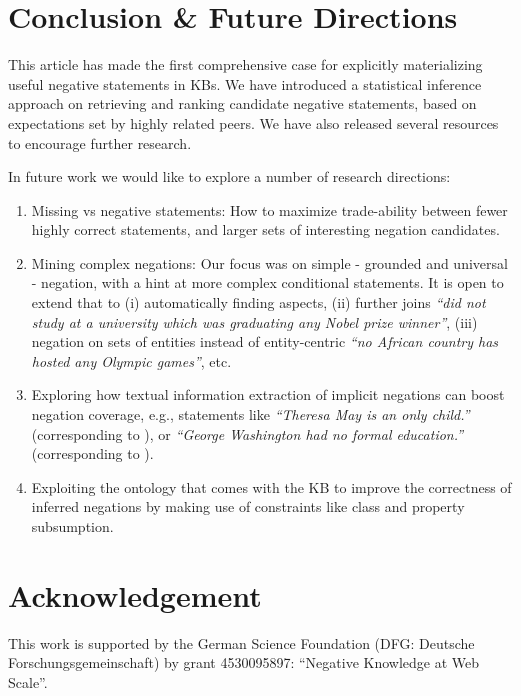 \section{Conclusion \& Future Directions}

This article has made the first comprehensive case for explicitly materializing useful negative statements in KBs. We have introduced a statistical inference approach on retrieving and ranking candidate negative statements, based on expectations set by highly related peers. We have also released several resources to encourage further research.

In future work we would like to explore a number of research directions:
\begin{enumerate}
    \item Missing vs negative statements: How to maximize trade-ability between fewer highly correct statements, and larger sets of interesting negation candidates.
    \item Mining complex negations: Our focus was on simple - grounded and universal - negation, with a hint at more complex conditional statements. It is open to extend that to (i) automatically finding aspects, (ii) further joins \textit{``did not study at a university which was graduating any Nobel prize winner''}, (iii) negation on sets of entities instead of entity-centric \textit{``no African country has hosted any Olympic games''}, etc.
    \item Exploring how textual information extraction of implicit negations can boost negation coverage, e.g., statements like \textit{``Theresa May is an only child.''} (corresponding to ), or \textit{``George Washington had no formal education.''} (corresponding to ).
    \item Exploiting the ontology that comes with the KB to improve the correctness of inferred negations by making use of constraints like class and property subsumption.
\end{enumerate}


\section*{Acknowledgement}
\noindent This work is supported by the German Science Foundation (DFG: Deutsche Forschungsgemeinschaft) by grant 4530095897: ``Negative Knowledge at Web Scale''.

